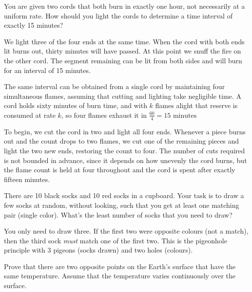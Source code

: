 \begin{problem}
You are given two cords that both burn in exactly one hour, not necessarily at a uniform rate. How should you light the cords to determine a time interval of exactly 15 minutes?
\end{problem}

\begin{solution}
We light three of the four ends at the same time. When the cord with both ends lit burns out, thirty minutes will have passed. At this point we snuff the fire on the other cord. The segment remaining can be lit from both sides and will burn for an interval of 15 minutes.

The same interval can be obtained from a single cord by maintaining four simultaneous flames, assuming that cutting and lighting take negligible time. A cord holds sixty minutes of burn time, and with $k$ flames alight that reserve is consumed at rate $k$, so four flames exhaust it in $\frac{60}{4} = 15 \text{ minutes}$

To begin, we cut the cord in two and light all four ends. Whenever a piece burns out and the count drops to two flames, we cut one of the remaining pieces and light the two new ends, restoring the count to four. The number of cuts required is not bounded in advance, since it depends on how unevenly the cord burns, but the flame count is held at four throughout and the cord is spent after exactly fifteen minutes.
\end{solution}

\begin{problem}
There are 10 black socks and 10 red socks in a cupboard. Your task is to draw a few socks at random, without looking, such that you get at least one matching pair (single color). What's the least number of socks that you need to draw?
\end{problem}

\begin{solution}
You only need to draw three. If the first two were opposite colours (not a match), then the third sock \textit{must} match one of the first two. This is the pigeonhole principle with 3 pigeons (socks drawn) and two holes (colours).
\end{solution}

\newpage

\begin{problem}
Prove that there are two opposite points on the Earth's surface that have the same temperature. Assume that the temperature varies continuously over the surface.
\end{problem}

